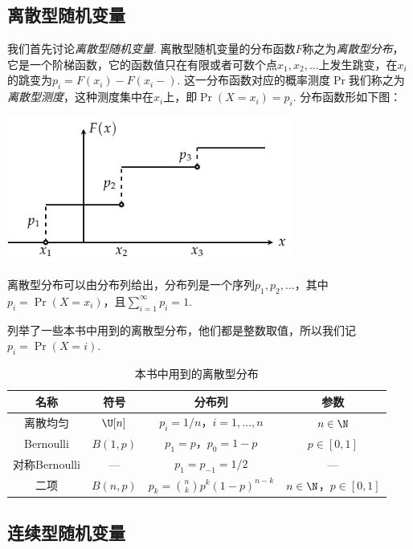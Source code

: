 \subsection{离散型随机变量}

我们首先讨论\emph{离散型随机变量}. 离散型随机变量的分布函数$F$称之为\emph{离散型分布}，它是一个阶梯函数，它的函数值只在有限或者可数个点$x_1,x_2,\dots$上发生跳变，在$x_i$的跳变为$p_i=F(x_i)-F(x_i-)$. 这一分布函数对应的概率测度$\Pr$我们称之为\emph{离散型测度}，这种测度集中在$x_i$上，即$\Pr(X=x_i)=p_i$. 分布函数形如下图：

\begin{center}
\includegraphics[width=0.7\textwidth]{Figures/prob/distribution-func.pdf}
\end{center}

离散型分布可以由分布列给出，分布列是一个序列$p_1,p_2,\dots$，其中$p_i=\Pr(X=x_i)$，且$\sum_{i=1}^\infty p_i=1$.

 列举了一些本书中用到的离散型分布，他们都是整数取值，所以我们记$p_i=\Pr(X=i)$.

\begin{table}[htbp]
\centering
\begin{tabular}{cccc}
\toprule
名称 & 符号 & 分布列 & 参数 \\
\midrule
离散均匀 & $\U[n]$ &$p_i=1/n$，$i=1,\dots,n$ & $n\in\N$ \\
Bernoulli & $B(1,p)$ & $p_1=p$，$p_0=1-p$ & $p\in[0,1]$ \\
对称Bernoulli & — &$p_1=p_{-1}=1/2$ & — \\
二项 &$B(n,p)$ &$p_k=\binom{n}{k}p^k(1-p)^{n-k}$ & $n\in\N$，$p\in[0,1]$ \\
\bottomrule
\end{tabular}
\caption{本书中用到的离散型分布}
\label{tab:discrete-distribution}
\end{table}

\subsection{连续型随机变量}\label{subsec:continuous-random-variable}

